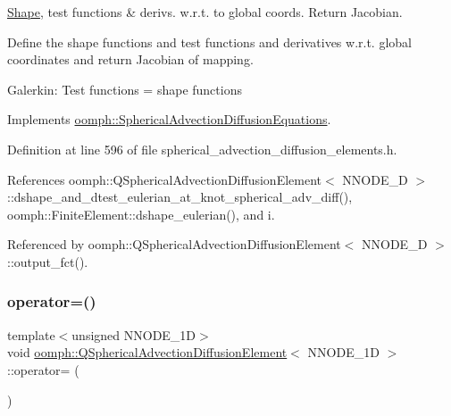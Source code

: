 \hyperlink{classoomph_1_1Shape}{Shape}, test functions \& derivs. w.\+r.\+t. to global coords. Return Jacobian. 

Define the shape functions and test functions and derivatives w.\+r.\+t. global coordinates and return Jacobian of mapping.

Galerkin\+: Test functions = shape functions 

Implements \hyperlink{classoomph_1_1SphericalAdvectionDiffusionEquations_adad87bb3578d688543743e139aa1d84f}{oomph\+::\+Spherical\+Advection\+Diffusion\+Equations}.



Definition at line 596 of file spherical\+\_\+advection\+\_\+diffusion\+\_\+elements.\+h.



References oomph\+::\+Q\+Spherical\+Advection\+Diffusion\+Element$<$ N\+N\+O\+D\+E\+\_\+D $>$\+::dshape\+\_\+and\+\_\+dtest\+\_\+eulerian\+\_\+at\+\_\+knot\+\_\+spherical\+\_\+adv\+\_\+diff(), oomph\+::\+Finite\+Element\+::dshape\+\_\+eulerian(), and i.



Referenced by oomph\+::\+Q\+Spherical\+Advection\+Diffusion\+Element$<$ N\+N\+O\+D\+E\+\_\+D $>$\+::output\+\_\+fct().

\mbox{\label{classoomph_1_1QSphericalAdvectionDiffusionElement_ade39bb468f6f05959ae31698b40cde10}} 
\subsubsection{\texorpdfstring{operator=()}{operator=()}}
{\footnotesize\ttfamily template$<$unsigned N\+N\+O\+D\+E\+\_\+1D$>$ \\
void \hyperlink{classoomph_1_1QSphericalAdvectionDiffusionElement}{oomph\+::\+Q\+Spherical\+Advection\+Diffusion\+Element}$<$ N\+N\+O\+D\+E\+\_\+1D $>$\+::operator= (\begin{DoxyParamCaption}\item[{const \hyperlink{classoomph_1_1QSphericalAdvectionDiffusionElement}{Q\+Spherical\+Advection\+Diffusion\+Element}$<$ N\+N\+O\+D\+E\+\_\+1D $>$ \&}]{ }\end{DoxyParamCaption})\hspace{0.3cm}{\ttfamily [inline]}}



